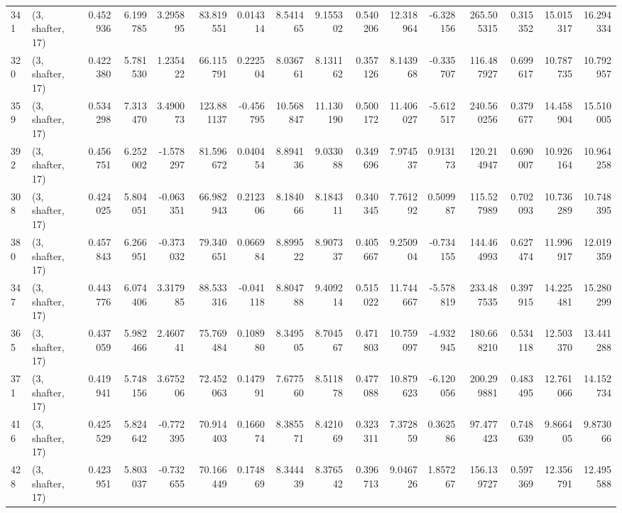 \begin{tabular}{llrrrrrrrrrrrrrr}
341 &  (3, shafter, 17) &   0.452936 &   6.199785 &   3.295895 &    83.819551 &   0.014314 &   8.541465 &   9.155302 &  0.540206 &  12.318964 &  -6.328156 &   265.505315 &  0.315352 &  15.015317 &  16.294334 \\
320 &  (3, shafter, 17) &   0.422380 &   5.781530 &   1.235422 &    66.115791 &   0.222504 &   8.036761 &   8.131162 &  0.357126 &   8.143968 &  -0.335707 &   116.487927 &  0.699617 &  10.787735 &  10.792957 \\
359 &  (3, shafter, 17) &   0.534298 &   7.313470 &   3.490073 &   123.881137 &  -0.456795 &  10.568847 &  11.130190 &  0.500172 &  11.406027 &  -5.612517 &   240.560256 &  0.379677 &  14.458904 &  15.510005 \\
392 &  (3, shafter, 17) &   0.456751 &   6.252002 &  -1.578297 &    81.596672 &   0.040454 &   8.894136 &   9.033088 &  0.349696 &   7.974537 &   0.913173 &   120.214947 &  0.690007 &  10.926164 &  10.964258 \\
308 &  (3, shafter, 17) &   0.424025 &   5.804051 &  -0.063351 &    66.982943 &   0.212306 &   8.184066 &   8.184311 &  0.340345 &   7.761292 &   0.509987 &   115.527989 &  0.702093 &  10.736289 &  10.748395 \\
380 &  (3, shafter, 17) &   0.457843 &   6.266951 &  -0.373032 &    79.340651 &   0.066984 &   8.899522 &   8.907337 &  0.405667 &   9.250904 &  -0.734155 &   144.464993 &  0.627474 &  11.996917 &  12.019359 \\
347 &  (3, shafter, 17) &   0.443776 &   6.074406 &   3.317985 &    88.533316 &  -0.041118 &   8.804788 &   9.409214 &  0.515022 &  11.744667 &  -5.578819 &   233.487535 &  0.397915 &  14.225481 &  15.280299 \\
365 &  (3, shafter, 17) &   0.437059 &   5.982466 &   2.460741 &    75.769484 &   0.108980 &   8.349505 &   8.704567 &  0.471803 &  10.759097 &  -4.932945 &   180.668210 &  0.534118 &  12.503370 &  13.441288 \\
371 &  (3, shafter, 17) &   0.419941 &   5.748156 &   3.675206 &    72.452063 &   0.147991 &   7.677560 &   8.511878 &  0.477088 &  10.879623 &  -6.120056 &   200.299881 &  0.483495 &  12.761066 &  14.152734 \\
416 &  (3, shafter, 17) &   0.425529 &   5.824642 &  -0.772395 &    70.914403 &   0.166074 &   8.385571 &   8.421069 &  0.323311 &   7.372859 &   0.362586 &    97.477423 &  0.748639 &   9.866405 &   9.873066 \\
428 &  (3, shafter, 17) &   0.423951 &   5.803037 &  -0.732655 &    70.166449 &   0.174869 &   8.344439 &   8.376542 &  0.396713 &   9.046726 &   1.857267 &   156.139727 &  0.597369 &  12.356791 &  12.495588 \\

\end{tabular}
